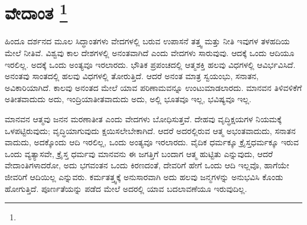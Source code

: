 
\chapter[ವೇದಾಂತ ]{ವೇದಾಂತ \protect\footnote{}}

ಹಿಂದೂ ದರ್ಶನದ ಮೂಲ ಸಿದ್ಧಾಂತಗಳು ವೇದಗಳಲ್ಲಿ ಬರುವ ಉಪಾಸನೆ ತತ್ತ್ವ ಮತ್ತು ನೀತಿ ಇವುಗಳ ತಳಹದಿಯ ಮೇಲೆ ನೀತಿವೆ. ವಿಶ್ವವು ಕಾಲ ದೇಶಗಳಲ್ಲಿ ಅನಂತವಾಗಿದೆ ಎಂದು ವೇದಗಳು ಸಾರುವುವು. ಆದಕ್ಕೆ ಒಂದು ಆದಿಯೂ ಇರಲಿಲ್ಲ. ಅದಕ್ಕೆ ಒಂದು ಅಂತ್ಯವೂ ಇರಲಾರದು. ಭೌತಿಕ ಪ್ರಪಂಚದಲ್ಲಿ ಆತ್ಮಶಕ್ತಿ ಹಲವು ವಿಧಗಳಲ್ಲಿ ಆವಿರ್ಭವಿಸಿದೆ. ಅನಂತವು ಸಾಂತದಲ್ಲಿ ಹಲವು ವಿಧಗಳಲ್ಲಿ ತೋರುತ್ತಿದೆ. ಆದರೆ ಅನಂತ ಮಾತ್ರ ಸ್ವಯಂಭು, ಸನಾತನ, ಅವಿಕಾರಿಯಾಗಿದೆ. ಕಾಲವು ಅನಂತದ ಮೇಲೆ ಯಾವ ಪರಿಣಾಮವನ್ನೂ ಉಂಟುಮಾಡಲಾರದು. ಮಾನವನ ತಿಳಿವಳಿಕೆಗೆ ಅತೀತವಾದುದು ಅದು, ಇಂದ್ರಿಯಾತೀತವಾದುದು ಅದು, ಅಲ್ಲಿ ಭೂತವೂ ಇಲ್ಲ, ಭವಿಷ್ಯವೂ ಇಲ್ಲ.

ಮಾನವನ ಆತ್ಮವು ಜನನ ಮರಣಾತೀತ ಎಂದು ವೇದಗಳು ಬೋಧಿಸುತ್ತವೆ. ದೇಹವು ವೃದ್ಧಿಕ್ಷಯಗಳ ನಿಯಮಕ್ಕೆ ಒಳಪಟ್ಟಿರುವುದು; ವೃದ್ಧಿಯಾಗುವುದು ಕ್ಷಯಿಸಲೇಬೇಕಾಗಿದೆ. ಆದರೆ ಅದರಲ್ಲಿರುವ ಆತ್ಮ ಅಭಂತವಾದುದು, ಸನಾತನ ವಾದುದು, ಅದಕ್ಕೊಂದು ಆದಿ ಇರಲಿಲ್ಲ, ಒಂದು ಅಂತ್ಯವೂ ಇರಲಾರದು. ವೈದಿಕ ಧರ್ಮಕ್ಕೂ ಕ್ರೈಸ್ತಧರ್ಮಕ್ಕೂ ಇರುವ ಒಂದು ವ್ಯತ್ಯಾಸವೇ, ಕ್ರೈಸ್ತ ಧರ್ಮವು ಮಾನವನು ಈ ಜಗತ್ತಿಗೆ ಬಂದಾಗ ಆತ್ಮ ಹುಟ್ಟಿತು ಎನ್ನುವುದು, ಆದರೆ ವೇದಾಂತಿಗಳಾದರೋ, ಅದು ಭಗವಂತನ ಒಂದು ಕಿರಣದಂತೆ, ದೇವರಿಗೆ ಹೇಗೆ ಒಂದು ಆದಿ ಇಲ್ಲವೊ, ಹಾಗೆಯೇ ಜೀವರಿಗೆ ಆದಿಯಿಲ್ಲ ಎನ್ನುವರು. ಕರ್ಮತತ್ತ್ವಕ್ಕೆ ಅನುಸಾರವಾಗಿ ಅದು ಹಲವು ಜನ್ಮಗಳನ್ನು ಅನುಭವಿಸಿ ಕೊಂಡು ಹೋಗುತ್ತಿದೆ. ಪೂರ್ಣತೆಯನ್ನು ಪಡೆದ ಮೇಲೆ ಅದರಲ್ಲಿ ಯಾವ ಬದಲಾವಣೆಯೂ ಇರುವುದಿಲ್ಲ.

